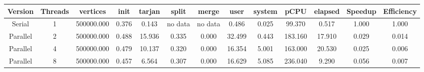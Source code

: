 \begin{tabular}{|c|c|c|c|c|c|c|c|c|c|c|c|c|}
\toprule
 Version &  Threads &   vertices &  init &  tarjan &   split &   merge &   user &  system &    pCPU &  elapsed &  Speedup &  Efficiency \\
\midrule
  Serial &        1 & 500000.000 & 0.376 &   0.143 & no data & no data &  0.486 &   0.025 &  99.370 &    0.517 &    1.000 &       1.000 \\
Parallel &        2 & 500000.000 & 0.488 &  15.936 &   0.335 &   0.000 & 32.499 &   0.443 & 183.160 &   17.910 &    0.029 &       0.014 \\
Parallel &        4 & 500000.000 & 0.479 &  10.137 &   0.320 &   0.000 & 16.354 &   5.001 & 163.000 &   20.530 &    0.025 &       0.006 \\
Parallel &        8 & 500000.000 & 0.457 &   6.564 &   0.307 &   0.000 & 16.629 &   5.085 & 236.040 &    9.290 &    0.056 &       0.007 \\
\bottomrule
\end{tabular}
